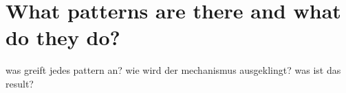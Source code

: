 \section{What patterns are there and what do they do?}\label{section:luckypatcher-patterns}
was greift jedes pattern an? wie wird der mechanismus ausgeklingt? was ist das result?
